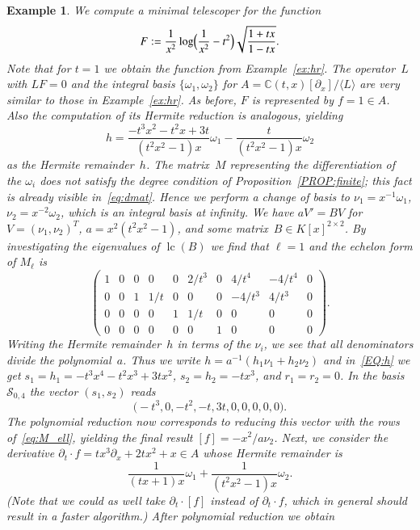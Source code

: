 \documentclass[final,1p,times,authoryear]{elsarticle}
\newtheorem{example}[theorem]{Example}
\def\<#1>{\langle#1\rangle}
\newcommand{\bC}{ {\mathbb C}}
\newcommand{\cS}{ {\mathcal S}}
\def\lc{\operatorname{lc}}
\begin{document}
\begin{example}
We compute a minimal telescoper for the function
\[
  F := \frac{1}{x^2} \log\Bigl(\frac{1}{x^2}-t^2\Bigr)\sqrt{\frac{1+tx}{1-tx}}.
\]
Note that for $t=1$ we
obtain the function from Example~\ref{ex:hr}. The operator~$L$ with $LF=0$
and the integral basis $\{\omega_1,\omega_2\}$ for
$A=\bC(t,x)[\partial_x]/\<L>$ are very similar to those in Example~\ref{ex:hr}.
As before, $F$ is represented by $f=1\in A$.
Also the computation of its Hermite reduction is analogous, yielding
\[
  h = \frac{-t^3x^2-t^2x+3t}{(t^2x^2-1)x} \omega_1 - \frac{t}{(t^2x^2-1)x} \omega_2
\]
as the Hermite remainder~$h$. The matrix~$M$ representing the differentiation
of the $\omega_i$ does not satisfy the degree condition of
Proposition~\ref{PROP:finite}; this fact is already visible
in~\eqref{eq:dmat}. Hence we perform a change of basis to
$\nu_1=x^{-1}\omega_1$, $\nu_2=x^{-2}\omega_2$, which is an integral basis at
infinity. We have $aV'=BV$ for $V=(\nu_1,\nu_2)^T$, $a=x^2(t^2x^2-1)$, and
some matrix~$B\in K[x]^{2\times2}$.  By investigating the eigenvalues of
$\lc(B)$ we find that $\ell=1$ and the echelon form of $M_\ell$ is
\begin{equation}\label{eq:M_ell}
  \begin{pmatrix}
  1 & 0 & 0 & 0 & 0 & 2/t^3 & 0 & 4/t^4 & -4/t^4 & 0 \\
  0 & 0 & 1 & 1/t & 0 & 0 & 0 & -4/t^3 & 4/t^3 & 0 \\
  0 & 0 & 0 & 0 & 1 & 1/t & 0 & 0 & 0 & 0 \\
  0 & 0 & 0 & 0 & 0 & 0 & 1 & 0 & 0 & 0
  \end{pmatrix}.
\end{equation}
Writing the Hermite remainder~$h$ in terms of the $\nu_i$, we see that all
denominators divide the polynomial~$a$. Thus we write
$h=a^{-1}(h_1\nu_1+h_2\nu_2)$ and in~\eqref{EQ:h} we get
$s_1=h_1=-t^3x^4-t^2x^3+3tx^2$, $s_2=h_2=-tx^3$, and $r_1=r_2=0$.
In the basis $\cS_{0,4}$ the vector $(s_1,s_2)$ reads
\[
  \bigl(-t^3, 0, -t^2, -t, 3 t, 0, 0, 0, 0, 0\bigr).
\]
The polynomial reduction now corresponds to reducing this vector with the rows
of~\eqref{eq:M_ell}, yielding the final result $[f]=-x^2/a\nu_2$.  Next, we
consider the derivative $\partial_t\cdot f=tx^3\partial_x+2tx^2+x\in A$ whose
Hermite remainder is
\[
  \frac{1}{(tx+1)x} \omega_1 + \frac{1}{(t^2x^2-1)x} \omega_2.
\]
(Note that we could as well take $\partial_t\cdot [f]$ instead of $\partial_t\cdot f$, which
in general should result in a faster algorithm.)
After polynomial reduction we obtain
\[
\]
\end{example}
\end{document}
